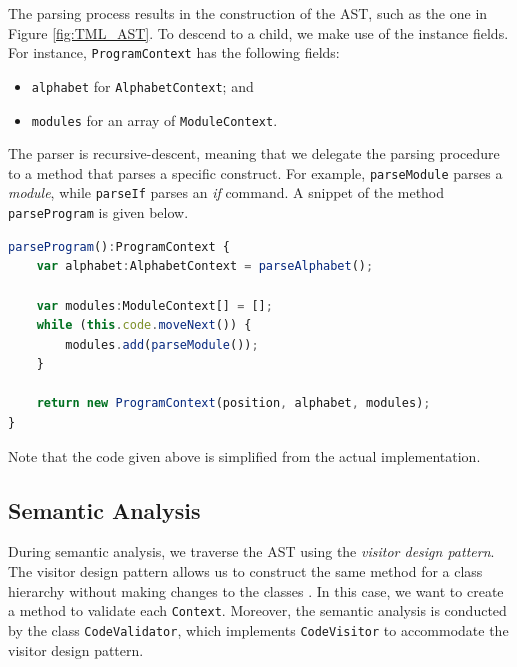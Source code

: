 The parsing process results in the construction of the AST, such as the one in Figure \ref{fig:TML_AST}. To descend to a child, we make use of the instance fields. For instance, \texttt{ProgramContext} has the following fields:
\begin{itemize}
    \item \texttt{alphabet} for \texttt{AlphabetContext}; and
    \item \texttt{modules} for an array of \texttt{ModuleContext}.
\end{itemize}

The parser is recursive-descent, meaning that we delegate the parsing procedure to a method that parses a specific construct. For example, \texttt{parseModule} parses a \textit{module}, while \texttt{parseIf} parses an \textit{if} command. A snippet of the method \texttt{parseProgram} is given below.
\begin{lstlisting}[language=TypeScript]
parseProgram():ProgramContext {
    var alphabet:AlphabetContext = parseAlphabet();
    
    var modules:ModuleContext[] = [];
    while (this.code.moveNext()) {
        modules.add(parseModule());
    }
    
    return new ProgramContext(position, alphabet, modules);
}
\end{lstlisting}
Note that the code given above is simplified from the actual implementation.

\subsection{Semantic Analysis}
During semantic analysis, we traverse the AST using the \emph{visitor design pattern}. The visitor design pattern allows us to construct the same method for a class hierarchy without making changes to the classes \citep{gamma1995design}. In this case, we want to create a method to validate each \texttt{Context}. Moreover, the semantic analysis is conducted by the class \texttt{CodeValidator}, which implements \texttt{CodeVisitor} to accommodate the visitor design pattern.

